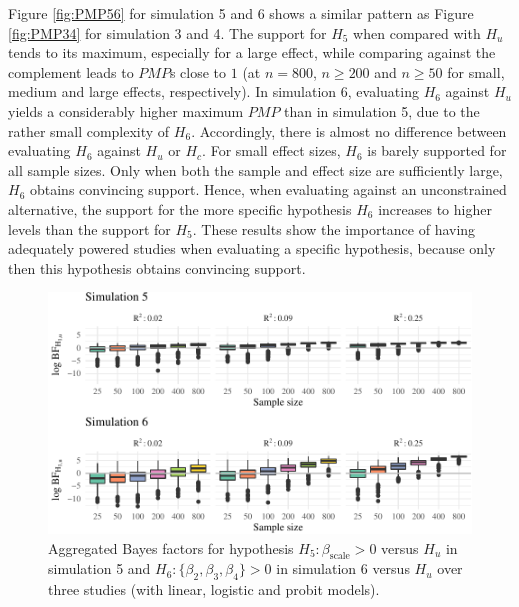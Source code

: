 \documentclass[review, 3p, authoryear]{elsarticle} %
\begin{document}
Figure \ref{fig:PMP56} for simulation 5 and 6 shows a similar pattern as Figure \ref{fig:PMP34} for simulation 3 and 4.
The support for \(H_5\) when compared with \(H_u\) tends to its maximum, especially for a large effect, while comparing against the complement leads to \(PMP\)s close to \(1\) (at \(n = 800\), \(n \geq 200\) and \(n \geq 50\) for small, medium and large effects, respectively).
In simulation 6, evaluating \(H_6\) against \(H_u\) yields a considerably higher maximum \(PMP\) than in simulation 5, due to the rather small complexity of \(H_6\).
Accordingly, there is almost no difference between evaluating \(H_6\) against \(H_u\) or \(H_c\).
For small effect sizes, \(H_6\) is barely supported for all sample sizes.
Only when both the sample and effect size are sufficiently large, \(H_6\) obtains convincing support.
Hence, when evaluating against an unconstrained alternative, the support for the more specific hypothesis \(H_6\) increases to higher levels than the support for \(H_5\).
These results show the importance of having adequately powered studies when evaluating a specific hypothesis, because only then this hypothesis obtains convincing support.

\begin{figure}
\includegraphics[width=1\linewidth]{manuscript_volker_files/figure-latex/BF56-1} \caption{Aggregated Bayes factors for hypothesis $H_5: \beta_{\text{scale}} > 0$ versus $H_u$ in simulation 5 and $H_6: \{\beta_2, \beta_3, \beta_4\} > 0$ in simulation 6 versus $H_u$ over three studies (with linear, logistic and probit models).}\label{fig:BF56}
\end{figure}
\end{document}
